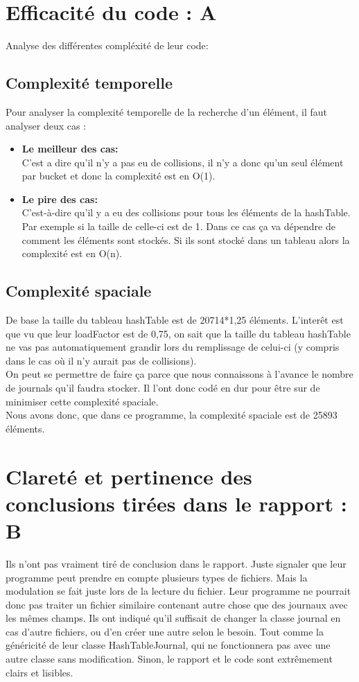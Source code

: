 \documentclass[a4paper]{article}
\begin{document}
\section*{Efficacité du code : A}
Analyse des différentes compléxité de leur code:

\subsection*{Complexité temporelle}

Pour analyser la complexité temporelle de la recherche d'un élément, il faut analyser deux cas :
\begin{itemize}
\item{\textbf{Le meilleur des cas:}}\\
C'est a dire qu'il n'y a pas eu de collisions, il n'y a donc qu'un seul élément par bucket et donc la complexité est en O(1).

\item{\textbf{Le pire des cas:}}\\
C'est-à-dire qu'il y a eu des collisions pour tous les éléments de la hashTable. Par exemple si la taille de celle-ci est de 1.
Dans ce cas ça va dépendre de comment les éléments sont stockés. Si ils sont stocké dans un tableau alors la complexité est en O(n).
\end{itemize}
\subsection*{Complexité spaciale}

De base la taille du tableau hashTable est de 20714*1,25 éléments. L'interêt est que vu que leur loadFactor est de 0,75, on sait que la taille du tableau hashTable ne vas pas automatiquement grandir lors du remplissage de celui-ci (y compris dans le cas où il n'y aurait pas de collisions).\\
On peut se permettre de faire ça parce que nous connaissons à l'avance le nombre de journals qu'il faudra stocker. Il l'ont donc codé en dur pour être sur de minimiser cette complexité spaciale.\\

Nous avons donc, que dans ce programme, la complexité spaciale est de 25893 éléments.

\section*{Clareté et pertinence des conclusions tirées dans le rapport : B}
Ils n'ont pas vraiment tiré de conclusion dans le rapport. Juste signaler que leur programme peut prendre en compte plusieurs types de fichiers. Mais la modulation se fait juste lors de la lecture du fichier. Leur programme ne pourrait donc pas traiter un fichier similaire contenant autre chose que des journaux avec les mêmes champs. Ils ont indiqué qu'il suffisait de changer la classe journal en cas d'autre fichiers, ou d'en créer une autre selon le besoin. Tout comme la généricité de leur classe HashTableJournal, qui ne fonctionnera pas avec une autre classe sans modification. Sinon, le rapport et le code sont extrêmement clairs et lisibles.
\end{document}
